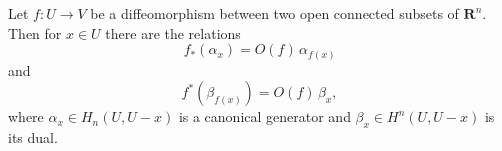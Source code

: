 Let $f: U \to V$ be a diffeomorphism between two open connected subsets of $\mathbf{R}^n$. Then for $x \in U$ there are the relations
$$f_*(\alpha_x) = O(f)\,\alpha_{f(x)}$$
and
$$f^*(\beta_{f(x)}) = O(f)\,\beta_x,$$
where $\alpha_x \in H_n(U, U - x)$ is a canonical generator and $\beta_x \in H^n(U, U - x)$ is its dual.
